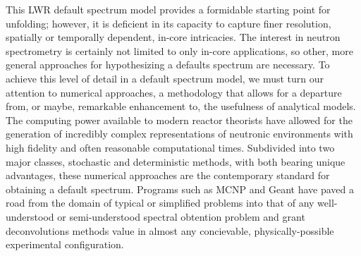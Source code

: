 This LWR default spectrum model provides a formidable starting point for unfolding; however, it is deficient in its capacity to capture finer resolution, spatially or temporally dependent, in-core intricacies.
The interest in neutron spectrometry is certainly not limited to only in-core applications, so other, more general approaches for hypothesizing a defaults spectrum are necessary.
To achieve this level of detail in a default spectrum model, we must turn our attention to numerical approaches, a methodology that allows for a departure from, or maybe, remarkable enhancement to, the usefulness of analytical models.
The computing power available to modern reactor theorists have allowed for the generation of incredibly complex representations of neutronic environments with high fidelity and often reasonable computational times.
Subdivided into two major classes, stochastic and deterministic methods, with both bearing unique advantages, these numerical approaches are the contemporary standard for obtaining a default spectrum.
Programs such as MCNP and Geant have paved a road from the domain of typical or simplified problems into that of any well-understood or semi-understood spectral obtention problem and grant deconvolutions methods value in almost any concievable, physically-possible experimental configuration.





